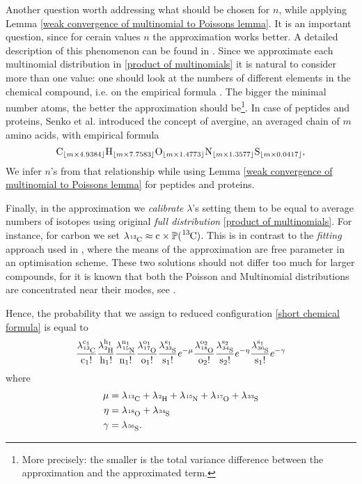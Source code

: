 Another question worth addressing what should be chosen for $n$, while applying Lemma \ref{weak convergence of multinomial to Poissons lemma}. It is an important question, since for cerain values $n$ the approximation works better. A detailed description of this phenomenon can be found in \cite{Roos1999OnTheRateOfMultivariatePoissonConvergence}. Since we approximate each multinomial distribution in \eqref{product of multinomials} it is natural to consider more than one value: one should look at the numbers of different elements in the chemical compound, i.e. on the empirical formula \molecule. The bigger the minimal number atoms, the better the approximation should be\footnote{More precisely: the smaller is the total variance difference between the approximation and the approximated term.}. In case of peptides and proteins, Senko et al. \cite{Senko1995Determination} introduced the concept of avergine, an averaged chain of $m$ amino acids, with empirical formula 
\begin{equation*}
	\cem{C}_{\lfloor m \times 4.9384\rfloor} 
	\cem{H}_{\lfloor m \times 7.7583\rfloor} 
	\cem{O}_{\lfloor m \times 1.4773\rfloor} 	
	\cem{N}_{\lfloor m \times 1.3577\rfloor} 
	\cem{S}_{\lfloor m \times 0.0417\rfloor},
\end{equation*}
We infer $n$'s from that relationship while using Lemma \ref{weak convergence of multinomial to Poissons lemma} for peptides and proteins.


Finally, in the approximation we {\it calibrate} $\lambda$'s setting them to be equal to average numbers of isotopes using original {\it full distribution} \eqref{product of multinomials}. For instance, for carbon we set $\lambda_\cem{^{13}C} \approx \cem{c} \times \prob( \cem{^{13}C} )$. This is in contrast to the {\it fitting} approach used in \cite{Breen2000AutomaticPeak,Valkenborg2007UsingPoisson}, where the means of the approximation are free parameter in an optimisation scheme. These two solutions should not differ too much for larger compounds, for it is known that both the Poisson and Multinomial distributions are concentrated near their modes, see \cite{Bobkov1998OnModifiedLogarithmicSobolev}.


Hence, the probability that we assign to reduced configuration \eqref{short chemical formula} is equal to 
\begin{equation}
	\poiss{\text{c}}{13}{1}
	\poiss{\text{h}}{2}{1}
	\poiss{\text{n}}{15}{1}
	\poiss{\text{o}}{17}{1}
	\poiss{\text{s}}{33}{1}
		e^{ - \mu}
	\poiss{\text{o}}{18}{2}	
	\poiss{\text{s}}{34}{2}
		e^{ - \eta }		
	\poiss{\text{s}}{36}{1}
		e^{ - \gamma }
\end{equation}
where 
\begin{align*}\label{intensities summed equation}
	\mu 	&=	\lambda_\cem{^{13}C} + \lambda_\cem{^{2}H} + \lambda_\cem{^{15}N} + \lambda_\cem{^{17}O} +\lambda_\cem{^{33}S}  	\\
	\eta 	&= 	\lambda_\cem{^{18}O} + \lambda_\cem{^{34}S}\\ 
	\gamma	&= 	\lambda_\cem{^{36}S}.
\end{align*}

